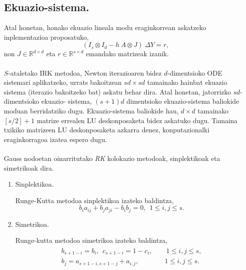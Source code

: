 \subsection{Ekuazio-sistema.}

Atal honetan, honako ekuazio lineala modu eraginkorrean askatzeko inplementazioa proposatuko,
\begin{equation}
\label{eq:linsys}
(I_s \otimes I_d - h \ A \otimes J) \ \Delta Y = r,
\end{equation}
non $J \in \mathbb{R}^{d \times d}$  eta $r \in \mathbb{R}^{s \times d}$ emandako matrizeak izanik.

\paragraph*{}$S$-ataletako IRK metodoa, Newton iterazioaren bidez $d$-dimentsioko ODE sistemari aplikatzeko, urrats bakoitzean $sd \times sd$ tamainako hainbat ekuazio sistema (iterazio bakoitzeko bat) askatu behar dira. Atal honetan, jatorrizko $sd$-dimentsioko ekuazio- sistema, $(s+1)d$ dimentsioko ekuazio-sistema baliokide moduan berridatziko dugu. Ekuazio-sistema baliokide hau,  $d \times d$ tamainako $[s/2]+1$ matrize errealen LU deskonposaketa bidez askatuko dugu. Tamaina txikiko matrizeen LU deskonposaketa azkarra denez, konputazionalki eraginkorragoa izatea espero dugu.      

\paragraph*{}Gauss nodoetan oinarritutako \emph{RK} kolokazio metodoak, sinplektikoak eta simetrikoak \cite{Sanz-Serna1992} dira. 
\begin{enumerate}
\item Sinplektikoa.

Runge-Kutta metodoa sinplektikoa izateko baldintza,
\begin{equation} 
\label{eq:sympl}
b_{i}a_{ij}+b_{j}a_{ji}-b_{i}b_{j}=0, \ \ 1 \leqslant i,j \leqslant s.
\end{equation} 
\item Simetrikoa.

Runge-kutta metodoa simetrikoa izateko baldintza,
\begin{align}
\label{eq:simm}
\begin{split}
b_{s+1-i}=b_i, \ \ {c}_{s+1-i}=1-{c}_i,& \quad \ 1\leqslant i,j \leqslant s, \\
b_j={a}_{s+1-i,s+1-j}+a_{i,j},& \quad 1\leqslant i,j \leqslant s. 
\end{split}
\end{align} 
\end{enumerate}

